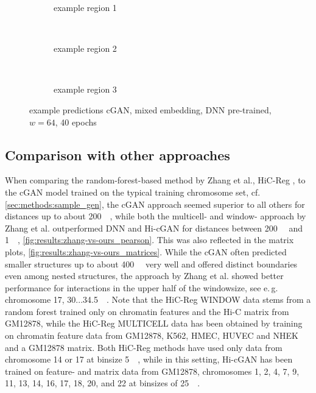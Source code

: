 \begin{figure}[p] %
    \begin{subfigure}{\textwidth}
        \centering
        \caption{example  region 1} \label{fig:results:cGAN64_pretrained_mixed_r1}
    \end{subfigure}\\[3mm]
    \begin{subfigure}{\textwidth}
        \centering
        \caption{example region 2} \label{fig:results:cGAN64_pretrained_mixed_r2}
    \end{subfigure}\\[3mm]
    \begin{subfigure}{\textwidth}
        \centering
        \caption{example region 3} \label{fig:results:cGAN64_pretrained_mixed_r3}
    \end{subfigure}
    \caption{example predictions cGAN, mixed embedding, DNN pre-trained, $w=64$, 40 epochs} 
     \label{fig:results:GAN64_pretrained_mixed_matrices}
\end{figure}

\clearpage
\subsection{Comparison with other approaches}\label{sec:results:comparison}
When comparing the random-forest-based method by Zhang et al., HiC-Reg \cite{Zhang2019}, to the cGAN model trained on the typical training chromosome set, cf. \ref{sec:methods:sample_gen},
the cGAN approach seemed superior to all others for distances up to about \SI{200}{\kilo\bp}, 
while both the multicell- and window- approach by Zhang et al. outperformed DNN and Hi-cGAN for distances between 
\SI{200}{\kilo\bp} and \SI{1}{\mega\bp}, \cref{fig:results:zhang-vs-ours_pearson}.
This was also reflected in the matrix plots, \cref{fig:results:zhang-vs-ours_matrices}. 
While the cGAN often predicted smaller structures up to about \SI{400}{\kilo\bp} very well and offered distinct boundaries
even among nested structures, the approach by Zhang et al. showed better performance for interactions in the upper half of the windowsize,
see e.\,g. chromosome 17, 30...\SI{34.5}{\mega\bp}.
Note that the HiC-Reg WINDOW data stems from a random forest trained only on chromatin features and the Hi-C matrix from GM12878,
while the HiC-Reg MULTICELL data has been obtained by training on chromatin feature data from GM12878, K562, HMEC, HUVEC and NHEK and a GM12878 matrix.
Both HiC-Reg methods have used only data from chromosome 14 or 17 at binsize \SI{5}{\kilo\bp},
while in this setting, Hi-cGAN has been trained on feature- and matrix data from GM12878, chromosomes 1, 2, 4, 7, 9, 11, 13, 14, 16, 17, 18, 20, and 22 at binsizes of \SI{25}{\kilo\bp}.

